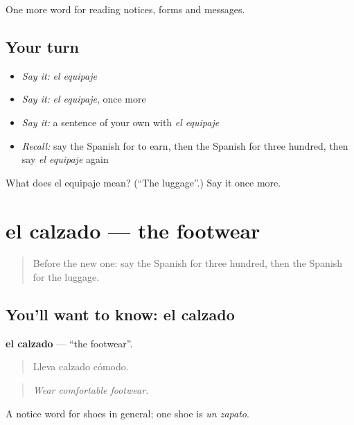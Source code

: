 \begin{grammarlens}[title={What you've built}]
One more word for reading notices, forms and messages.
\end{grammarlens}

\subsection*{Your turn}
\begin{itemize}
\raggedright
  \item \emph{Say it:} \emph{el equipaje}
  \item \emph{Say it:} \emph{el equipaje}, once more
  \item \emph{Say it:} a sentence of your own with \emph{el equipaje}
  \item \emph{Recall:} say the Spanish for to earn, then the Spanish for three hundred, then say \emph{el equipaje} again
\end{itemize}

\begin{tcolorbox}[breakable,colback=teal!4,colframe=teal!35!black,title={Before you move on}]
What does el equipaje mean? (\textquotedblleft{}The luggage\textquotedblright{}.) Say it once more.
\end{tcolorbox}
\section[el calzado]{el calzado — the footwear}

\label{lesson:ES-C478-calzado}



\begin{quote}
Before the new one: say the Spanish for three hundred, then the Spanish for the luggage.
\end{quote}

\subsection*{You'll want to know: el calzado}
\textbf{el calzado} — \textquotedblleft{}the footwear\textquotedblright{}.

\begin{quote}
Lleva calzado cómodo.
\end{quote}

\begin{quote}
\emph{Wear comfortable footwear.}
\end{quote}

A notice word for shoes in general; one shoe is \emph{un zapato}.


